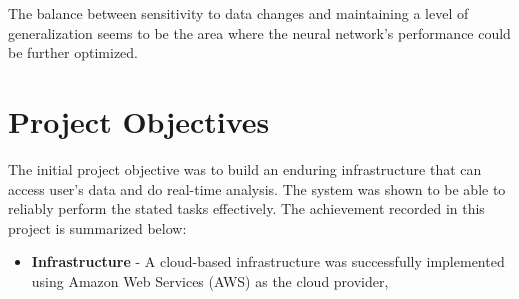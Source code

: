 The balance between sensitivity to data changes and maintaining a level of generalization seems to be the area where the neural network's performance could be further optimized.

\section{Project Objectives}
The initial project objective was to build an enduring infrastructure that can access user's data and do real-time analysis. The system was shown to be able to reliably 
perform the stated tasks effectively. The achievement recorded in this project is summarized below:
\begin{itemize}
\item \textbf{Infrastructure} - A cloud-based infrastructure was successfully implemented using Amazon Web Services (AWS) as the cloud provider,  
\end{itemize}

